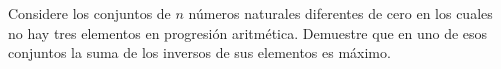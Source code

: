 Considere los conjuntos de $n$ números naturales diferentes de cero en los cuales no hay tres elementos en progresión aritmética.
Demuestre que en uno de esos conjuntos la suma de los inversos de sus elementos es máximo.